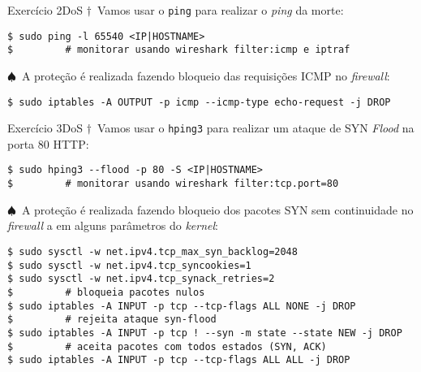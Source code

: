   \begin{frame}[fragile]{Exercício 2}{DoS}
 {\color{red}$\dagger$~Vamos usar o {\tt ping} para realizar o {\em ping} da morte:}
\begin{verbatim}
$ sudo ping -l 65540 <IP|HOSTNAME> 
$         # monitorar usando wireshark filter:icmp e iptraf
\end{verbatim}

 \bigskip\pause

{\color{blue}$\spadesuit$~A proteção é realizada fazendo bloqueio das requisições ICMP no {\em firewall}:}
\begin{verbatim}
$ sudo iptables -A OUTPUT -p icmp --icmp-type echo-request -j DROP
\end{verbatim}
    \end{frame}


    \begin{frame}[fragile]{Exercício 3}{DoS}
    {\color{red}$\dagger$~Vamos usar o {\tt hping3} para realizar um ataque de {\sc SYN} {\em Flood} na porta 80 {\sc HTTP}:}
\begingroup\footnotesize
\begin{verbatim}
$ sudo hping3 --flood -p 80 -S <IP|HOSTNAME> 
$         # monitorar usando wireshark filter:tcp.port=80
\end{verbatim}
\endgroup

\bigskip\pause

{\color{blue}$\spadesuit$~A proteção é realizada fazendo bloqueio dos pacotes SYN sem continuidade no {\em firewall} a em alguns parâmetros do {\em kernel}:}
\begingroup\footnotesize
\begin{verbatim}
$ sudo sysctl -w net.ipv4.tcp_max_syn_backlog=2048
$ sudo sysctl -w net.ipv4.tcp_syncookies=1
$ sudo sysctl -w net.ipv4.tcp_synack_retries=2
$         # bloqueia pacotes nulos
$ sudo iptables -A INPUT -p tcp --tcp-flags ALL NONE -j DROP   
$         # rejeita ataque syn-flood
$ sudo iptables -A INPUT -p tcp ! --syn -m state --state NEW -j DROP 
$         # aceita pacotes com todos estados (SYN, ACK)
$ sudo iptables -A INPUT -p tcp --tcp-flags ALL ALL -j DROP   
\end{verbatim}
\endgroup
\end{frame}

